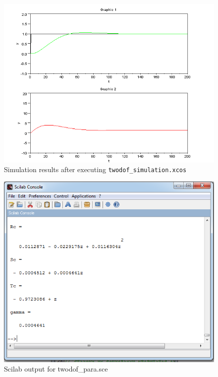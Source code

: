\begin{figure}
\centering
\includegraphics[width=0.8\linewidth]{2-DOF_manual/2dof-sim-result}
\caption{Simulation results after executing  {\tt twodof\_simulation.xcos}}
\label{2dof-sim-res}
\end{figure}
\begin{figure}
\centering
\includegraphics[width=0.8\linewidth]{2-DOF_manual/sci-console}
\caption{Scilab output for \ttfamily twodof\_para.sce}
\label{2dof-para-out}
\end{figure}

